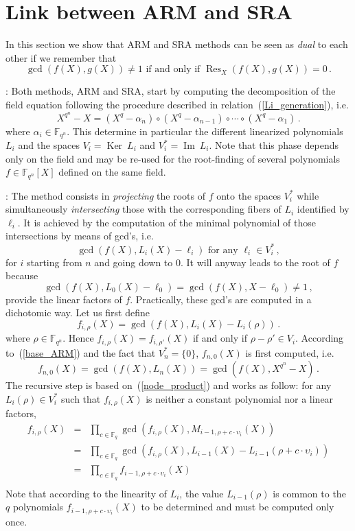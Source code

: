 \documentclass{sig-alternate}
\newcommand{\ff}[1]{\mathbb{F}_{#1}}
\newcommand{\qq}{q}
\newcommand{\nn}{n}
\newcommand{\qn}{{\qq^\nn}}
\newcommand{\basef}{\ff{\qq}}
\newcommand{\extf}{\ff{\qn}}
\DeclareMathOperator{\Ker}{Ker}
\DeclareMathOperator{\Ima}{Im}
\DeclareMathOperator{\Res}{Res}
\begin{document}
\section{Link between ARM and SRA}
\label{sec:arm-sra}

In this section we show that ARM and SRA methods can be seen as
\emph{dual} to each other if we remember that
$$\gcd(f(X),g(X)) \ne 1 \mbox{  if and only if }\Res_X(f(X),g(X))=0\,.$$

\medskip

: Both methods, ARM and SRA, start by computing the decomposition of the field equation following the procedure described in relation~(\ref{Li_generation}), i.e.
 $$X^{\qn}-X=(X^\qq - \alpha_\nn) \circ (X^\qq - \alpha_{\nn-1}) \circ \cdots \circ (X^\qq - \alpha_1) \,.$$
where $\alpha_i \in \extf$. This determine in particular the different linearized polynomials $L_i$ and the spaces $V_i=\Ker~L_i$ and $V_i^\ast=\Ima~L_i$. Note that this phase depends only on the field and may be re-used for the root-finding of several polynomials $f \in \extf[X]$ defined on the same field.

\medskip

: The method consists in \emph{projecting} the roots of $f$ onto the spaces $V_i^\ast$ while simultaneously \emph{intersecting} those with the corresponding fibers of $L_i$ identified by $\ell_i$.
 It is achieved by the computation of the minimal polynomial of those intersections by means of gcd's, i.e. 
 \begin{equation}
 \label{base_ARM}
\gcd(f(X),L_i(X)-\ell_i)     \mbox{ for any }  \ell_i  \in V_i^\ast\,,
\end{equation}
for $i$ starting from $n$ and going down to 0.
It will anyway leads to the root of $f$ because 
$$\gcd(f(X),L_0(X)-\ell_0)=\gcd(f(X),X-\ell_0) \ne 1\,,$$ 
provide the linear factors of $f$. Practically, these gcd's are computed in a dichotomic way. Let us first define
 $$f_{i,\rho}(X)=\gcd(f(X),L_i(X)-L_i(\rho))\,.$$
where $\rho \in \extf$. Hence $f_{i,\rho}(X)=f_{i,\rho'}(X)$ if and only if $\rho-\rho' \in V_i$.
According to~(\ref{base_ARM}) and the fact that $V_n^\ast=\{0\}$, $f_{n,0}(X)$ is first computed, i.e.
 $$f_{n,0}(X)=\gcd(f(X),L_n(X))=\gcd(f(X),X^{q^\nn}-X)\,.$$
The recursive step is based on~(\ref{node_product}) and works as follow: for any $L_i(\rho) \in V_i^\ast$ such that $f_{i,\rho}(X)$ is neither a constant polynomial nor a linear factors,
  $$
  \begin{array}{lll}
  f_{i,\rho}(X)&=&\prod_{c \in \basef} \gcd(f_{i,\rho}(X),M_{i-1,\rho+c \cdot \upsilon_i}(X)) \\
               &=&\prod_{c \in \basef} \gcd(f_{i,\rho}(X),L_{i-1}(X)-L_{i-1}(\rho+c \cdot \upsilon_i)) \\
               &=&\prod_{c \in \basef} f_{i-1,\rho+c \cdot  \upsilon_i}(X)\\
  \end{array}              
  $$ 
 Note that according to the linearity of $L_i$, the value $L_{i-1}(\rho)$ is common to the $\qq$ polynomials $f_{i-1,\rho+c \cdot  \upsilon_i}(X)$ to be determined and must be computed only once. 
 
\end{document}

